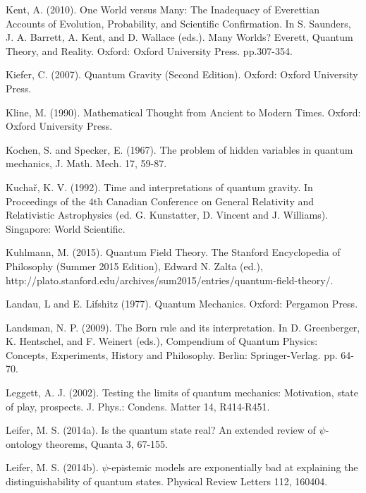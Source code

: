 \begin{thebibliography}{}
\bibitem{} Kent, A. (2010). One World versus Many: The Inadequacy of Everettian Accounts of Evolution, Probability, and Scientific Confirmation. In S. Saunders,  J. A. Barrett,  A. Kent, and D. Wallace (eds.). Many Worlds? Everett, Quantum Theory, and Reality. Oxford: Oxford University Press. pp.307-354.

\bibitem{} Kiefer, C. (2007). Quantum Gravity (Second Edition). Oxford: Oxford University Press. 

\bibitem{} Kline, M. (1990). Mathematical Thought from Ancient to Modern Times. Oxford: Oxford University Press.

\bibitem{} Kochen, S. and Specker, E. (1967). The problem of hidden variables in quantum mechanics, J. Math. Mech. 17, 59-87.

\bibitem{} Kucha\v r, K. V. (1992). Time and interpretations of quantum gravity. In Proceedings of the 4th Canadian Conference on General Relativity and Relativistic Astrophysics (ed. G. Kunstatter, D. Vincent and J. Williams). Singapore: World Scientific.

\bibitem{} Kuhlmann, M. (2015). Quantum Field Theory. The Stanford Encyclopedia of Philosophy (Summer 2015 Edition), Edward N. Zalta (ed.), http://plato.stanford.edu/archives/sum2015/entries/quantum-field-theory/.

\bibitem{}  Landau, L and E. Lifshitz (1977). Quantum Mechanics. Oxford: Pergamon Press.

\bibitem{} Landsman, N. P. (2009). The Born rule and its interpretation. In D. Greenberger, K. Hentschel, and F. Weinert (eds.), Compendium of Quantum Physics: Concepts, Experiments, History and Philosophy. Berlin: Springer-Verlag. pp. 64-70.


\bibitem{} Leggett, A. J. (2002). Testing the limits of quantum mechanics: Motivation, state of play, prospects. J. Phys.: Condens. Matter 14, R414-R451. 


\bibitem{} Leifer, M. S. (2014a). Is the quantum state real? An extended review of $\psi$-ontology theorems, Quanta 3, 67-155.

\bibitem{}   Leifer, M. S. (2014b). $\psi$-epistemic models are exponentially bad at explaining the distinguishability of quantum states. Physical Review Letters 112, 160404.


\end{thebibliography}
